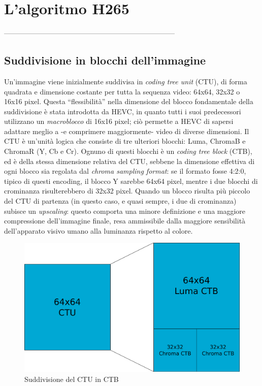 
\chapter{L'algoritmo H265} %

\label{Chapter4} %


------------------------------------------------------------------------

\section{Suddivisione in blocchi dell'immagine} 
Un'immagine viene inizialmente suddivisa in \emph{coding tree unit} (CTU), di 
forma quadrata e dimensione costante per tutta la sequenza video: 64x64, 32x32 
o 16x16 pixel. Questa ``flessibilità'' nella dimensione del blocco fondamentale 
della suddivisione è stata introdotta da HEVC, in quanto tutti i suoi 
predecessori utilizzano un \emph{macroblocco} di 16x16 pixel; ciò permette a 
HEVC di sapersi adattare meglio a -e comprimere maggiormente- video di diverse 
dimensioni.
Il CTU è un'unità logica che consiste di tre ulteriori blocchi: Luma, 
ChromaB e ChromaR (Y, Cb e Cr). Ognuno di questi blocchi è un 
\emph{coding tree block} (CTB), ed è della stessa dimensione relativa 
del CTU, sebbene la dimensione effettiva di ogni blocco sia regolata dal 
\emph{chroma sampling format}: se il formato fosse 4:2:0, tipico di questi 
encoding, il blocco Y sarebbe 64x64 pixel, mentre i due blocchi di crominanza 
risulterebbero di 32x32 pixel. Quando un blocco risulta più piccolo del 
CTU di partenza (in questo caso, e quasi sempre, i due di crominanza) 
subisce un \emph{upscaling}: questo comporta una minore definizione e una 
maggiore compressione dell'immagine finale, resa ammissibile dalla maggiore 
sensibilità dell'apparato visivo umano alla luminanza rispetto al colore.
\begin{figure}[H]
  \centering
    \includegraphics[scale=0.20]{Figures/CTU-CTB}
  \caption{Suddivisione del CTU in CTB}
\end{figure}
